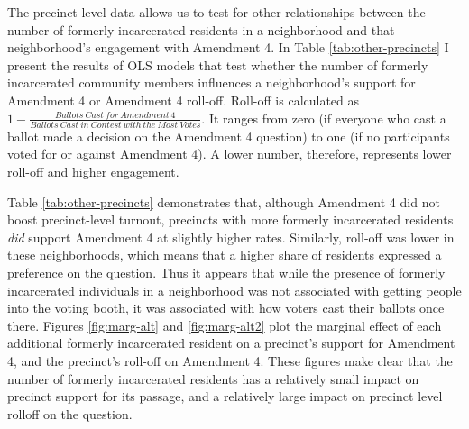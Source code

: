 \documentclass[
  12pt,
]{article}
\begin{document}
The precinct-level data allows us to test for other relationships between the number of formerly incarcerated residents in a neighborhood and that neighborhood's engagement with Amendment 4. In Table \ref{tab:other-precincts} I present the results of OLS models that test whether the number of formerly incarcerated community members influences a neighborhood's support for Amendment 4 or Amendment 4 roll-off. Roll-off is calculated as \(1 - \frac{Ballots\:Cast\:for\:Amendment\:4}{Ballots\:Cast\:in\:Contest\:with\:the\:Most\:Votes}\). It ranges from zero (if everyone who cast a ballot made a decision on the Amendment 4 question) to one (if no participants voted for or against Amendment 4). A lower number, therefore, represents lower roll-off and higher engagement.

\begin{singlespace}


\end{singlespace}

Table \ref{tab:other-precincts} demonstrates that, although Amendment 4 did not boost precinct-level turnout, precincts with more formerly incarcerated residents \emph{did} support Amendment 4 at slightly higher rates. Similarly, roll-off was lower in these neighborhoods, which means that a higher share of residents expressed a preference on the question. Thus it appears that while the presence of formerly incarcerated individuals in a neighborhood was not associated with getting people into the voting booth, it was associated with how voters cast their ballots once there. Figures \ref{fig:marg-alt} and \ref{fig:marg-alt2} plot the marginal effect of each additional formerly incarcerated resident on a precinct's support for Amendment 4, and the precinct's roll-off on Amendment 4. These figures make clear that the number of formerly incarcerated residents has a relatively small impact on precinct support for its passage, and a relatively large impact on precinct level rolloff on the question.
\end{document}
